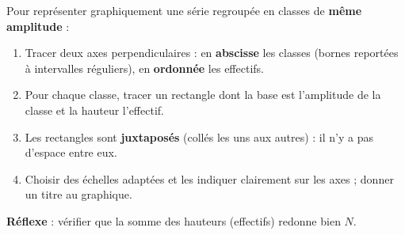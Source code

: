 \documentclass[11pt]{article}
\newcommand{\cle}[1]{{\popxbold\color{popdark}#1}}
\begin{document}
\begin{methode}
Pour représenter graphiquement une série regroupée en classes de \textbf{même amplitude} :
\begin{enumerate}
\item Tracer deux axes perpendiculaires : en \textbf{abscisse} les classes (bornes reportées à intervalles réguliers), en \textbf{ordonnée} les effectifs.
\item Pour chaque classe, tracer un \cle{rectangle} dont la base est l'amplitude de la classe et la hauteur l'effectif.
\item Les rectangles sont \textbf{juxtaposés} (collés les uns aux autres) : il n'y a pas d'espace entre eux.
\item Choisir des échelles adaptées et les indiquer clairement sur les axes ; donner un titre au graphique.
\end{enumerate}
\textbf{Réflexe} : vérifier que la somme des hauteurs (effectifs) redonne bien $N$.
\end{methode}
\end{document}

